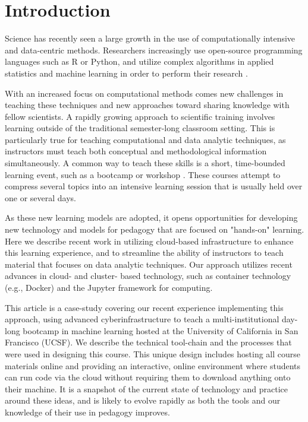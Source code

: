 \section{Introduction}

Science has recently seen a large growth in the use of
computationally intensive and data-centric methods. Researchers
increasingly use open-source programming languages such as R or Python, and utilize
complex algorithms in applied statistics and machine learning in order to
perform their research \cite{momcheva2015astro}.

With an increased focus on computational methods
comes new challenges in teaching these techniques and new approaches
toward sharing knowledge with fellow scientists.
A rapidly growing approach to scientific training involves learning
outside of the traditional semester-long classroom setting.
This is particularly true
for teaching computational and data analytic techniques,
as instructors must teach both conceptual and methodological information
simultaneously. A common way to teach these skills is a short,
time-bounded learning event, such as a bootcamp or workshop
\cite{wilson2016software}. These  courses attempt to compress several
topics into an intensive learning session that is usually held over one or
several days.

As these new learning models are adopted, it opens
opportunities for developing new technology and models for pedagogy that are
focused on "hands-on" learning. Here we describe
recent work in utilizing cloud-based infrastructure to enhance this learning
experience, and to streamline the ability of instructors to
teach material that focuses on data analytic techniques. Our approach
utilizes recent advances in cloud- and cluster- based technology, such
as container technology (e.g., Docker) and the
Jupyter framework for computing.

This article is a case-study covering our recent experience implementing this approach, using
advanced cyberinfrastructure to teach a multi-institutional day-long bootcamp in machine learning
hosted at the University of California in San Francisco (UCSF).
We describe the technical tool-chain and the processes that were used in
designing this course. This
unique design includes hosting all course materials online and providing
an interactive, online environment where students can run code via the cloud
without requiring them to download anything onto their machine.
It is a snapshot of the current state
of technology and practice around these ideas, and is likely to evolve rapidly
as both the tools and our knowledge of their use in pedagogy improves.

